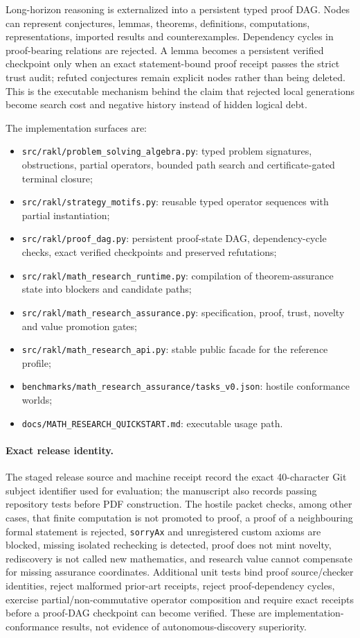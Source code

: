 Long-horizon reasoning is externalized into a persistent typed proof DAG. Nodes can represent conjectures, lemmas, theorems, definitions, computations, representations, imported results and counterexamples. Dependency cycles in proof-bearing relations are rejected. A lemma becomes a persistent verified checkpoint only when an exact statement-bound proof receipt passes the strict trust audit; refuted conjectures remain explicit nodes rather than being deleted. This is the executable mechanism behind the claim that rejected local generations become search cost and negative history instead of hidden logical debt.

The implementation surfaces are:
\begin{itemize}[leftmargin=*]
\item \texttt{src/rakl/problem\_solving\_algebra.py}: typed problem signatures, obstructions, partial operators, bounded path search and certificate-gated terminal closure;
\item \texttt{src/rakl/strategy\_motifs.py}: reusable typed operator sequences with partial instantiation;
\item \texttt{src/rakl/proof\_dag.py}: persistent proof-state DAG, dependency-cycle checks, exact verified checkpoints and preserved refutations;
\item \texttt{src/rakl/math\_research\_runtime.py}: compilation of theorem-assurance state into blockers and candidate paths;
\item \texttt{src/rakl/math\_research\_assurance.py}: specification, proof, trust, novelty and value promotion gates;
\item \texttt{src/rakl/math\_research\_api.py}: stable public facade for the reference profile;
\item \texttt{benchmarks/math\_research\_assurance/tasks\_v0.json}: hostile conformance worlds;
\item \texttt{docs/MATH\_RESEARCH\_QUICKSTART.md}: executable usage path.
\end{itemize}

\paragraph{Exact release identity.}
The staged release source and machine receipt record the exact 40-character Git subject identifier used for evaluation; the manuscript also records \SoftwareTests{} passing repository tests before PDF construction. The hostile packet checks, among other cases, that finite computation is not promoted to proof, a proof of a neighbouring formal statement is rejected, \texttt{sorryAx} and unregistered custom axioms are blocked, missing isolated rechecking is detected, proof does not mint novelty, rediscovery is not called new mathematics, and research value cannot compensate for missing assurance coordinates. Additional unit tests bind proof source/checker identities, reject malformed prior-art receipts, reject proof-dependency cycles, exercise partial/non-commutative operator composition and require exact receipts before a proof-DAG checkpoint can become verified. These are implementation-conformance results, not evidence of autonomous-discovery superiority.

